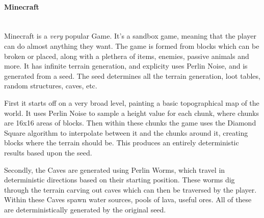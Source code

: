\begin{flushleft}
                        \vspace{1cm}
                    \paragraph{Minecraft} \mbox{} \\
                        \vspace{0.2cm}
                        Minecraft is a \textit{very} popular Game. It's a sandbox game, meaning that the player can do almost anything they want.
                        The game is formed from blocks which can be broken or placed, along with a plethera of items, enemies, passive animals
                        and more. It has infinite terrain generation, and explicity uses Perlin Noise, and is generated from a seed. The seed determines
                        all the terrain generation, loot tables, random structures, caves, etc. \\
                        
                        \vspace{0.2cm}

                        First it starts off on a very broad level, painting a basic topographical map of the world. It uses Perlin Noise to sample
                        a height value for each chunk, where chunks are 16x16 areas of blocks. Then within these chunks the game uses the Diamond Square
                        algorithm to interpolate between it and the chunks around it, creating blocks where the terrain should be. This produces an 
                        entirely deterministic results based upon the seed.\\

                        \vspace{0.2cm}

                        Secondly, the Caves are generated using Perlin Worms, which travel in deterministic directions based on their starting position.
                        These worms dig through the terrain carving out caves which can then be traversed by the player. Within these Caves spawn water
                        sources, pools of lava, useful ores. All of these are deterministically generated by the original seed. \\ 


\end{flushleft}
